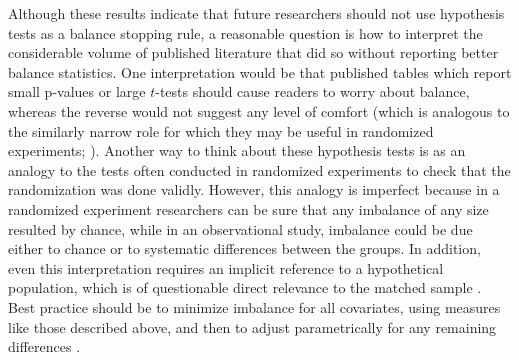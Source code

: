 \documentclass[11pt,titlepage]{article}
\begin{document}
Although these results indicate that future researchers should not use
hypothesis tests as a balance stopping rule, a reasonable question is
how to interpret the considerable volume of published literature that
did so without reporting better balance statistics.  One
interpretation would be that published tables which report small
p-values or large $t$-tests should cause readers to worry about
balance, whereas the reverse would not suggest any level of comfort
(which is analogous to the similarly narrow role for which they may be
useful in randomized experiments; \citealt{Senn94}).  Another way to
think about these hypothesis tests is as an analogy to the tests often
conducted in randomized experiments to check that the randomization
was done validly.  However, this analogy is imperfect because in a
randomized experiment researchers can be sure that any imbalance of
any size resulted by chance, while in an observational study,
imbalance could be due either to chance or to systematic differences
between the groups.  In addition, even this interpretation requires an
implicit reference to a hypothetical population, which is of
questionable direct relevance to the matched sample \citep{Cochran65}.
Best practice should be to minimize imbalance for all covariates,
using measures like those described above, and then to adjust
parametrically for any remaining differences
\citep{Rubin79,RosRub84a,HoImaKin06}.


\clearpage


\end{document}
